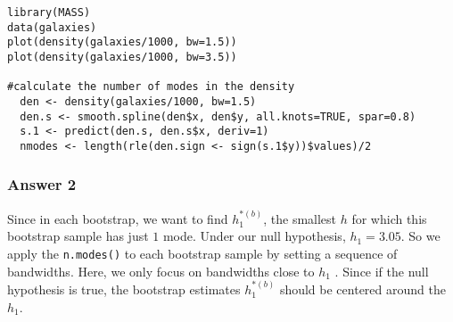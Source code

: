 \documentclass[
]{article}
\begin{document}
\begin{verbatim}
library(MASS)
data(galaxies)
plot(density(galaxies/1000, bw=1.5))
plot(density(galaxies/1000, bw=3.5))

#calculate the number of modes in the density
  den <- density(galaxies/1000, bw=1.5)
  den.s <- smooth.spline(den$x, den$y, all.knots=TRUE, spar=0.8)
  s.1 <- predict(den.s, den.s$x, deriv=1)
  nmodes <- length(rle(den.sign <- sign(s.1$y))$values)/2
\end{verbatim}

\hypertarget{answer-2}{%
\subsubsection{Answer 2}\label{answer-2}}

Since in each bootstrap, we want to find \(h_1^{*(b)}\), the smallest
\(h\) for which this bootstrap sample has just \(1\) mode. Under our
null hypothesis, \(h_1 = 3.05\). So we apply the \texttt{n.modes()} to
each bootstrap sample by setting a sequence of bandwidths. Here, we only
focus on bandwidths close to \(h_1\) . Since if the null hypothesis is
true, the bootstrap estimates \(h_1^{*(b)}\) should be centered around
the \(h_1\).
\end{document}
